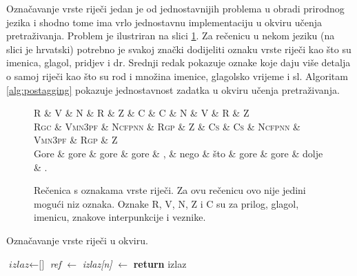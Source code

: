 Označavanje vrste riječi jedan je od jednostavnijih problema u obradi prirodnog
jezika i shodno tome ima vrlo jednostavnu implementaciju u okviru učenja
pretraživanja. Problem je ilustriran na slici \ref{fig:postagging}. Za rečenicu
u nekom jeziku (na slici je hrvatski) potrebno je svakoj znački dodijeliti
oznaku vrste riječi kao što su imenica, glagol, pridjev i dr. Srednji redak
pokazuje oznake koje daju više detalja o samoj riječi kao što su rod i množina
imenice, glagolsko vrijeme i sl. Algoritam \ref{alg:postagging} pokazuje
jednostavnost zadatka u okviru učenja pretraživanja.

\begin{figure}
\centering
\begin{dependency}
\begin{deptext}
  \textsc{R}   \& \textsc{V}      \& \textsc{N}      \& \textsc{R}   \& \textsc{Z} \& \textsc{C}  \& \textsc{C}  \& \textsc{N}      \& \textsc{V}      \& \textsc{R}   \& \textsc{Z} \\
  \textsc{Rgc} \& \textsc{Vmn3pf} \& \textsc{Ncfpnn} \& \textsc{Rgp} \& \textsc{Z} \& \textsc{Cs} \& \textsc{Cs} \& \textsc{Ncfpnn} \& \textsc{Vmn3pf} \& \textsc{Rgp} \& \textsc{Z} \\
  Gore         \& gore            \& gore            \& gore         \& ,          \& nego        \& što         \& gore            \& gore            \& dolje        \& .          \\
\end{deptext}
\end{dependency}
\caption[Rečenica s oznakama vrste riječi.]{Rečenica s oznakama vrste riječi. Za
ovu rečenicu ovo nije jedini mogući niz oznaka. Oznake R, V, N, Z i C su za
prilog, glagol, imenicu, znakove interpunkcije i veznike.}
\label{fig:postagging}
\end{figure}

\begin{algorithm}
\caption{Označavanje vrste riječi u \lts{} okviru.}\label{alg:postagging}
\begin{algorithmic}[1]
\State $\textit{izlaz} \gets \text{[]}$
  \State \textit{ref} $\gets$ 
  \State \textit{izlaz[n]} $\gets$ 
\EndFor
\State {}
\State \textbf{return} izlaz
\EndFunction
\end{algorithmic}
\end{algorithm}

